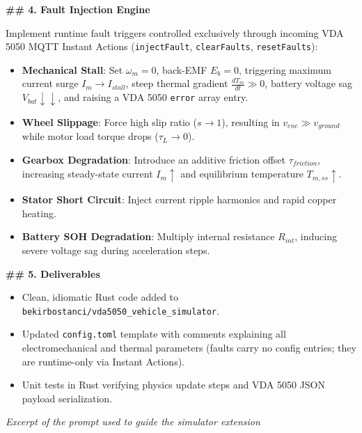 \begin{promptbox}
\textbf{\#\# 4. Fault Injection Engine}

Implement runtime fault triggers controlled exclusively through incoming VDA 5050 MQTT Instant Actions (\texttt{injectFault}, \texttt{clearFaults}, \texttt{resetFaults}):

\begin{itemize}
    \item \textbf{Mechanical Stall}: Set $\omega_m = 0$, back-EMF $E_b = 0$, triggering maximum current surge $I_m \to I_{\mathit{stall}}$, steep thermal gradient $\frac{dT_m}{dt} \gg 0$, battery voltage sag $V_{\mathit{bat}} \downarrow\downarrow$, and raising a VDA 5050 \texttt{error} array entry.
    \item \textbf{Wheel Slippage}: Force high slip ratio ($s \to 1$), resulting in $v_{\mathit{enc}} \gg v_{\mathit{ground}}$ while motor load torque drops ($\tau_L \to 0$).
    \item \textbf{Gearbox Degradation}: Introduce an additive friction offset $\tau_{\mathit{friction}}$, increasing steady-state current $I_m \uparrow$ and equilibrium temperature $T_{m,\mathit{ss}} \uparrow$.
    \item \textbf{Stator Short Circuit}: Inject current ripple harmonics and rapid copper heating.
    \item \textbf{Battery SOH Degradation}: Multiply internal resistance $R_{\mathit{int}}$, inducing severe voltage sag during acceleration steps.
\end{itemize}

\textbf{\#\# 5. Deliverables}

\begin{itemize}
    \item Clean, idiomatic Rust code added to \texttt{bekirbostanci/vda5050\_vehicle\_simulator}.
    \item Updated \texttt{config.toml} template with comments explaining all electromechanical and thermal parameters (faults carry no config entries; they are runtime-only via Instant Actions).
    \item Unit tests in Rust verifying physics update steps and VDA 5050 JSON payload serialization.
\end{itemize}

\par\vspace{6pt}
{\centering\small\textit{Excerpt of the prompt used to guide the simulator extension}\par}
\end{promptbox}

